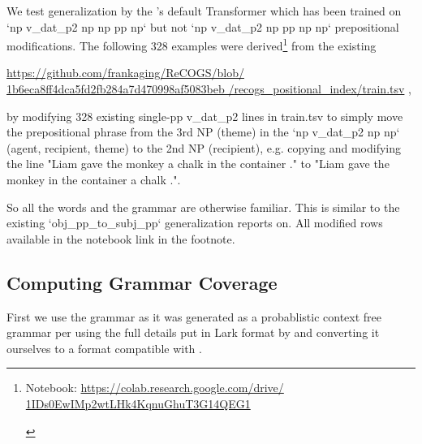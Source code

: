 \documentclass[11pt]{article}
\begin{document}
We test generalization by the \citep{Wu2023}'s default Transformer which has been trained on `np v\_dat\_p2 np np pp np` but not `np v\_dat\_p2 np pp np np` prepositional modifications.
The following 328 examples were derived\footnote{\begin{footnotesize}Notebook: \href{https://colab.research.google.com/drive/1IDs0EwIMp2wtLHk4KqnuGhuT3G14QEG1}{https://colab.research.google.com/drive/
1IDs0EwIMp2wtLHk4KqnuGhuT3G14QEG1}\end{footnotesize}} from the existing

\href{https://github.com/frankaging/ReCOGS/blob/1b6eca8ff4dca5fd2fb284a7d470998af5083beb/recogs_positional_index/train.tsv}{https://github.com/frankaging/ReCOGS/blob/
1b6eca8ff4dca5fd2fb284a7d470998af5083beb
/recogs\_positional\_index/train.tsv} , 

by modifying 328 existing single-pp v\_dat\_p2 lines in train.tsv to simply move the prepositional phrase from the 3rd NP (theme) in the `np v\_dat\_p2 np np` (agent, recipient, theme) to the 2nd NP (recipient), e.g. copying and modifying the line "Liam gave the monkey a chalk in the container ." to "Liam gave the monkey in the container a chalk .".

So all the words and the grammar are otherwise familiar. This is similar to the existing `obj\_pp\_to\_subj\_pp` generalization \citep{Wu2023} reports on.
All modified rows available in the notebook link in the footnote.


\subsection{Computing Grammar Coverage}
\label{computing_grammar_coverage}

First we use the grammar as it was generated as a probablistic context free grammar per \citep{KimLinzen2020}
using the full details put in Lark format by \citep{klinger2024compositionalprogramgenerationfewshot}
and converting it ourselves to a format compatible with \citep{fuzzingbook2023:GrammarCoverageFuzzer}.
\end{document}
